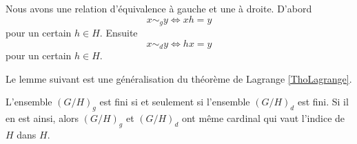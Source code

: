 Nous avons une relation d'équivalence à gauche et une à droite. D'abord
\begin{equation}
    x\sim_g y\Leftrightarrow xh=y
\end{equation}
pour un certain \( h\in H\). Ensuite
\begin{equation}
    x\sim_d y\Leftrightarrow hx=y
\end{equation}
pour un certain \( h\in H\). 

Le lemme suivant est une généralisation du théorème de Lagrange \ref{ThoLagrange}.

\begin{lemma}
    L'ensemble \( (G/H)_g\) est fini si et seulement si l'ensemble \( (G/H)_d\) est fini. Si il en est ainsi, alors \( (G/H)_g\) et \( (G/H)_d\) ont même cardinal qui vaut l'indice de \( H\) dans \( H\).
\end{lemma}

